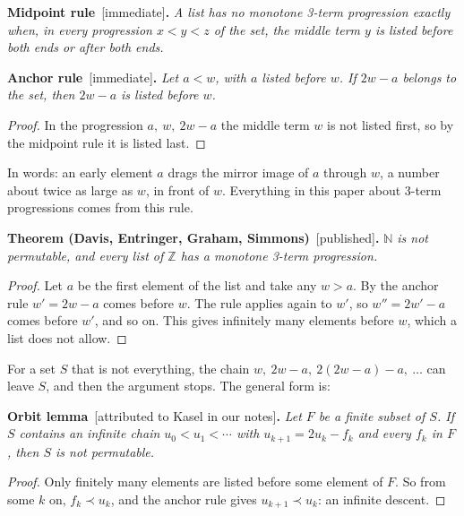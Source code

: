\documentclass[11pt,letterpaper]{article}
\newcommand{\Z}{\mathbb{Z}}
\newcommand{\N}{\mathbb{N}}
\newcommand{\bef}{\prec}
\newcommand{\st}[1]{\textnormal{\textsf{\small[#1]}}}
\newenvironment{result}[2]%
  {\par\medskip\noindent\textbf{#1}\ \st{#2}\textbf{.}\enspace\itshape}%
  {\par\medskip}
\begin{document}
\begin{result}{Midpoint rule}{immediate}
A list has no monotone 3-term progression exactly when, in every progression $x < y < z$ of the set, the
middle term $y$ is listed before both ends or after both ends.
\end{result}

\begin{result}{Anchor rule}{immediate}
Let $a < w$, with $a$ listed before $w$. If $2w - a$ belongs to the set, then $2w - a$ is listed before $w$.
\end{result}

\begin{proof}
In the progression $a,\ w,\ 2w-a$ the middle term $w$ is not listed first, so by the midpoint rule it is
listed last.
\end{proof}

In words: an early element $a$ drags the mirror image of $a$ through $w$, a number about twice as large as
$w$, in front of $w$. Everything in this paper about 3-term progressions comes from this rule.

\begin{result}{Theorem (Davis, Entringer, Graham, Simmons)}{published}
$\N$ is not permutable, and every list of $\Z$ has a monotone 3-term progression.
\end{result}

\begin{proof}
Let $a$ be the first element of the list and take any $w > a$. By the anchor rule $w' = 2w - a$ comes before
$w$. The rule applies again to $w'$, so $w'' = 2w' - a$ comes before $w'$, and so on. This gives infinitely
many elements before $w$, which a list does not allow.
\end{proof}

For a set $S$ that is not everything, the chain $w,\ 2w-a,\ 2(2w-a)-a,\ \dots$ can leave $S$, and then the
argument stops. The general form is:

\begin{result}{Orbit lemma}{attributed to Kasel in our notes}
Let $F$ be a finite subset of $S$. If $S$ contains an infinite chain $u_0 < u_1 < \cdots$ with
$u_{k+1} = 2u_k - f_k$ and every $f_k$ in $F$, then $S$ is not permutable.
\end{result}

\begin{proof}
Only finitely many elements are listed before some element of $F$. So from some $k$ on, $f_k \bef u_k$, and
the anchor rule gives $u_{k+1} \bef u_k$: an infinite descent.
\end{proof}
\end{document}
